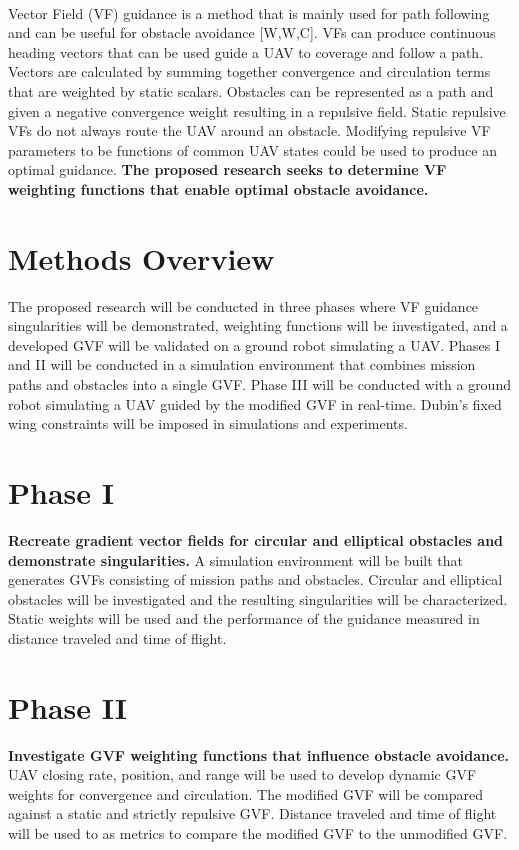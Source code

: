 \documentclass[numbered,pdftex]{ohio-etd}
\begin{document}
\\
Vector Field (VF) guidance is a method that is mainly used for path following and can be useful for obstacle avoidance [W,W,C]. VFs can produce continuous heading vectors that can be used guide a UAV to coverage and follow a path. Vectors are calculated by summing together convergence and circulation terms that are weighted by static scalars. Obstacles can be represented as a path and given a negative convergence weight resulting in a repulsive field. Static repulsive VFs do not always route the UAV around an obstacle. Modifying repulsive VF parameters to be functions of common UAV states could be used to produce an optimal guidance. \textbf{The proposed research seeks to determine VF weighting functions that enable optimal obstacle avoidance.}



 \pagebreak
 
 
\section{Methods Overview}
The proposed research will be conducted in three phases where VF guidance  singularities will be demonstrated, weighting functions will be investigated, and a developed GVF will be validated on a ground robot simulating a UAV.  Phases I and II will be conducted in a simulation environment that combines mission paths and obstacles into a single GVF. Phase III will be conducted with a ground robot simulating a UAV guided by the modified GVF in real-time. Dubin's fixed wing constraints will be imposed in simulations and experiments. 


\section{Phase I}
\textbf{Recreate gradient vector fields for circular and elliptical obstacles and demonstrate singularities.} A simulation environment will be built that generates GVFs consisting of mission paths and obstacles. Circular and elliptical obstacles will be investigated and the resulting singularities will be characterized. Static weights will be used and the performance of the guidance measured in distance traveled and time of flight. 



\section{Phase II}
\textbf{Investigate GVF weighting functions that influence obstacle avoidance.} UAV closing rate, position, and range will be used to develop dynamic GVF weights for convergence and circulation. The modified GVF will be compared against a static and strictly repulsive GVF. Distance traveled and time of flight will be used to as metrics to compare the modified GVF to the unmodified GVF.  
\end{document}
